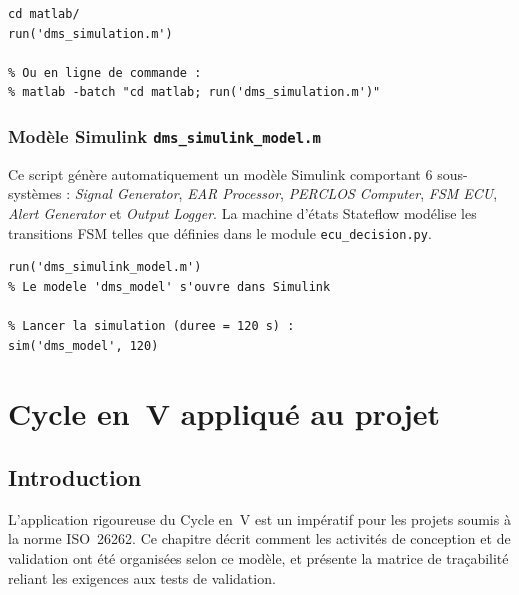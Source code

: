 \documentclass[12pt,a4paper]{report}
\begin{document}
\begin{lstlisting}[style=matlab, caption={Lancement de la simulation MATLAB}, label=lst:matlab_sim]
% Dans MATLAB (R2023b ou posterieur) :
cd matlab/
run('dms_simulation.m')

% Ou en ligne de commande :
% matlab -batch "cd matlab; run('dms_simulation.m')"
\end{lstlisting}

\subsection{Mod\`ele Simulink \texttt{dms\_simulink\_model.m}}

Ce script g\'en\`ere automatiquement un mod\`ele Simulink comportant 6 sous-syst\`emes : \textit{Signal Generator}, \textit{EAR Processor}, \textit{PERCLOS Computer}, \textit{FSM ECU}, \textit{Alert Generator} et \textit{Output Logger}. La machine d'\'etats Stateflow mod\'elise les transitions FSM telles que d\'efinies dans le module \texttt{ecu\_decision.py}.

\begin{lstlisting}[style=matlab, caption={G\'en\'eration et lancement du mod\`ele Simulink}, label=lst:simulink]
% Generer et ouvrir le modele :
run('dms_simulink_model.m')
% Le modele 'dms_model' s'ouvre dans Simulink

% Lancer la simulation (duree = 120 s) :
sim('dms_model', 120)
\end{lstlisting}

\clearpage

\chapter{Cycle en~V appliqu\'e au projet}

\section{Introduction}

L'application rigoureuse du Cycle en~V est un impératif pour les projets soumis \`a la norme ISO~26262. Ce chapitre d\'ecrit comment les activit\'es de conception et de validation ont \'et\'e organis\'ees selon ce mod\`ele, et pr\'esente la matrice de tra\c{c}abilit\'e reliant les exigences aux tests de validation.
\end{document}
